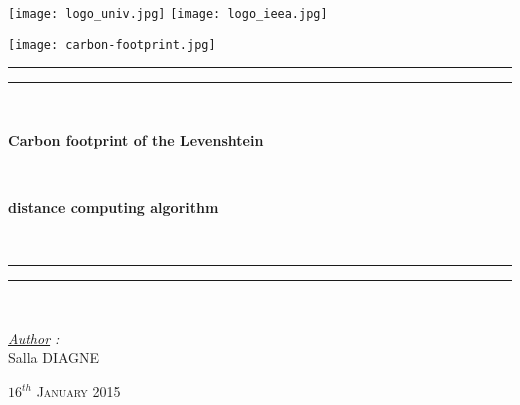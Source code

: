 \thispagestyle{cover}

\texttt{[image: logo\_univ.jpg]}
 \hfill \texttt{[image: logo\_ieea.jpg]} \\

\vspace*{10mm}

\begin{center}
	
	\texttt{[image: carbon-footprint.jpg]}
	
	\vspace*{12mm}	

	\rule[0.5ex]{\linewidth}{2pt}\vspace*{-\baselineskip}\vspace*{3.2pt}
	\rule[0.5ex]{\linewidth}{1pt}\\[\baselineskip]

		\begin{Huge} \textbf{Carbon footprint of the Levenshtein} \end{Huge}\\[4mm]
		\begin{Huge} \textbf{distance computing algorithm} \end{Huge}\\[4mm]
	\rule[0.5ex]{\linewidth}{1pt}\vspace*{-\baselineskip}\vspace{3.2pt}
	\rule[0.5ex]{\linewidth}{2pt}\\

	\vspace*{20mm}

	{\LARGE \textit{\underline{Author} :}}\\
	\vspace*{6mm}
	{\LARGE Salla DIAGNE}\\
	
	\vspace*{20mm}
	
	{\LARGE\textsc{$16^{th}$ January 2015}}
\end{center}